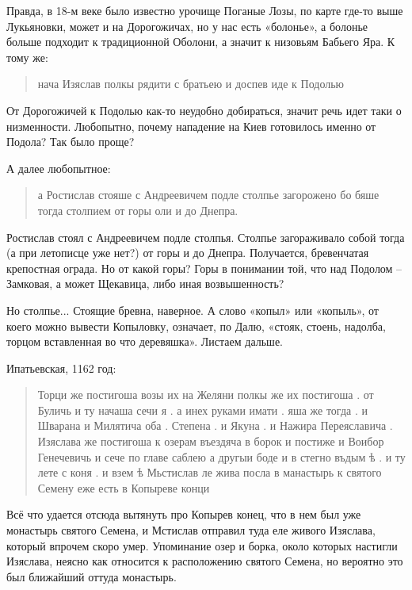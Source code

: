 Правда, в 18-м веке было известно урочище Поганые Лозы, по карте где-то выше Лукьяновки, может и на Дорогожичах, но у нас есть «болонье», а болонье больше подходит к традиционной Оболони, а значит к низовьям Бабьего Яра. К тому же:

\begin{quotation}
нача Изяслав полкы рядити с братьею и доспев иде к Подолью
\end{quotation}

От Дорогожичей к Подолью как-то неудобно добираться, значит речь идет таки о низменности. Любопытно, почему нападение на Киев готовилось именно от Подола? Так было проще? 

А далее любопытное:

\begin{quotation}
а Ростислав стояше с Андреевичем
подле столпье загорожено бо бяше тогда  столпием от горы оли и до Днепра.\end{quotation}

Ростислав стоял с Андреевичем подле столпья. Столпье загораживало собой тогда (а при летописце уже нет?) от горы и до Днепра. Получается, бревенчатая крепостная ограда. Но от какой горы? Горы в понимании той, что над Подолом – Замковая, а может Щекавица, либо иная возвышенность?

Но столпье... Стоящие бревна, наверное. А слово «копыл» или «копыль», от коего можно вывести Копыловку, означает, по Далю, «стояк,  стоень,  надолба, торцом  вставленная во что деревяшка». Листаем дальше.

Ипатьевская, 1162 год:

\begin{quotation}
Торци же постигоша возы их на Желяни полкы же их постигоша . от Буличь и ту начаша сечи я . а инех руками имати . яша же тогда . и Шварана  и Милятича оба . Степена . и Якуна . и Нажира Переяславича . Изяслава же постигоша к озерам въездяча в борок и постиже и Воибор Генечевичь и сече по главе саблею а другыи  боде и в стегно въдым ѣ . и ту
лете с коня . и взем ѣ Мьстислав ле жива посла в манастырь к святого Семену еже есть  в Копыреве конци
\end{quotation}

Всё что удается отсюда вытянуть про Копырев конец, что в нем был уже монастырь святого Семена, и Мстислав отправил туда еле живого Изяслава, который впрочем скоро умер. Упоминание озер и борка, около которых настигли Изяслава, неясно как относится к расположению святого Семена, но вероятно это был ближайший оттуда монастырь.

